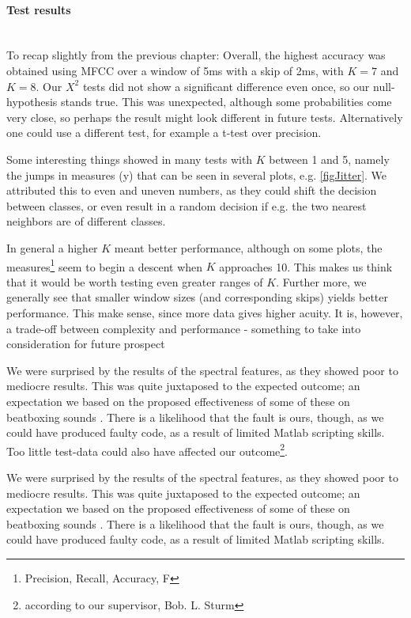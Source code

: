 \paragraph{Test results} \hspace{0pt} \\

To recap slightly from the previous chapter: Overall, the highest accuracy was obtained using MFCC over a window of 5ms with a skip of 2ms, with $K=7$ and $K=8$. Our $X^2$ tests did not show a significant difference even once, so our null-hypothesis stands true. This was unexpected, although some probabilities come very close, so perhaps the result might look different in future tests. Alternatively one could use a different test, for example a t-test over precision.

Some interesting things showed in many tests with $K$ between 1 and 5, namely the jumps in measures (y) that can be seen in several plots, e.g. \ref{figJitter}. We attributed this to even and uneven numbers, as they could shift the decision between classes, or even result in a random decision if e.g. the two nearest neighbors are of different classes.

In general a higher $K$ meant better performance, although on some plots, the measures\footnote{Precision, Recall, Accuracy, F} seem to begin a descent when $K$ approaches 10. This makes us think that it would be worth testing even greater ranges of $K$. 
Further more, we generally see that smaller window sizes (and corresponding skips) yields better performance. This make sense, since more data gives higher acuity. It is, however, a trade-off between complexity and performance - something to take into consideration for future prospect

We were surprised by the results of the spectral features, as they showed poor to mediocre results. This was quite juxtaposed to the expected outcome; an expectation we based on the proposed effectiveness of some of these on beatboxing sounds \citep{Sinyor05}. There is a likelihood that the fault is ours, though, as we could have produced faulty code, as a result of limited Matlab scripting skills. Too little test-data could also have affected our outcome\footnote{according to our supervisor, Bob. L. Sturm}.




We were surprised by the results of the spectral features, as they showed poor to mediocre results. This was quite juxtaposed to the expected outcome; an expectation we based on the proposed effectiveness of some of these on beatboxing sounds \citep{Sinyor05}. There is a likelihood that the fault is ours, though, as we could have produced faulty code, as a result of limited Matlab scripting skills.

